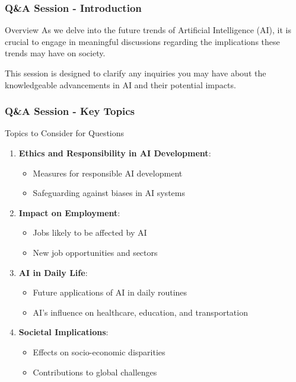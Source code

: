 \documentclass[aspectratio=169]{beamer}
\begin{document}
\begin{frame}[fragile]
    \frametitle{Q\&A Session - Introduction}
    \begin{block}{Overview}
        As we delve into the future trends of Artificial Intelligence (AI), it is crucial to engage in meaningful discussions regarding the implications these trends may have on society. 
    \end{block}
    This session is designed to clarify any inquiries you may have about the knowledgeable advancements in AI and their potential impacts.
\end{frame}

\begin{frame}[fragile]
    \frametitle{Q\&A Session - Key Topics}
    \begin{block}{Topics to Consider for Questions}
        \begin{enumerate}
            \item \textbf{Ethics and Responsibility in AI Development}:
                \begin{itemize}
                    \item Measures for responsible AI development
                    \item Safeguarding against biases in AI systems
                \end{itemize}

            \item \textbf{Impact on Employment}:
                \begin{itemize}
                    \item Jobs likely to be affected by AI
                    \item New job opportunities and sectors
                \end{itemize}

            \item \textbf{AI in Daily Life}:
                \begin{itemize}
                    \item Future applications of AI in daily routines
                    \item AI's influence on healthcare, education, and transportation
                \end{itemize}

            \item \textbf{Societal Implications}:
                \begin{itemize}
                    \item Effects on socio-economic disparities
                    \item Contributions to global challenges
                \end{itemize}


\end{enumerate}
\end{block}
\end{frame}
\end{document}
